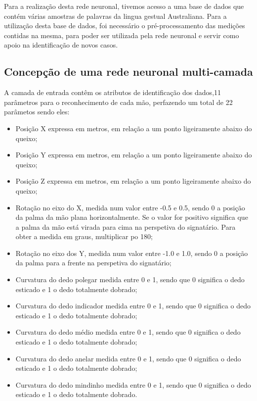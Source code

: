 \documentclass[10pt,a4paper]{article}
\begin{document}
Para a realização desta rede neuronal, tivemos acesso a uma base de dados que contém várias amostras de palavras da lingua gestual Australiana. Para a utilização desta base de dados, foi necessário o pré-processamento das medições contidas na mesma, para poder ser utilizada pela rede neuronal e servir como apoio na identificação de novos casos.

\subsection{Concepção de uma rede neuronal multi-camada}
\subitem

A camada de entrada contêm os atributos de identificação dos dados,11 parâmetros para o reconhecimento de cada mão, perfazendo um total de 22 parâmetos sendo eles:
\begin{itemize}
\item Posição X expressa em metros, em relação a um ponto ligeiramente abaixo do queixo;
\item Posição Y expressa em metros, em relação a um ponto ligeiramente abaixo do queixo;
\item Posição Z expressa em metros, em relação a um ponto ligeiramente abaixo do queixo;
\item Rotação no eixo do X, medida num valor entre -0.5 e 0.5, sendo 0 a posição da palma da mão plana horizontalmente. Se o valor for positivo significa que a palma da mão está virada para cima na perspetiva do signatário. Para obter a medida em graus, multiplicar po 180;
\item Rotação no eixo dos Y, medida num valor entre -1.0 e 1.0, sendo 0 a posição da palma para a frente na perspetiva do signatário;
\item Curvatura do dedo polegar medida entre 0 e 1, sendo que 0 significa o dedo esticado e 1 o dedo totalmente dobrado;
\item Curvatura do dedo indicador medida entre 0 e 1, sendo que 0 significa o dedo esticado e 1 o dedo totalmente dobrado;
\item Curvatura do dedo médio medida entre 0 e 1, sendo que 0 significa o dedo esticado e 1 o dedo totalmente dobrado;
\item Curvatura do dedo anelar medida entre 0 e 1, sendo que 0 significa o dedo esticado e 1 o dedo totalmente dobrado;
\item Curvatura do dedo mindinho medida entre 0 e 1, sendo que 0 significa o dedo esticado e 1 o dedo totalmente dobrado.
\end{itemize}
\end{document}
